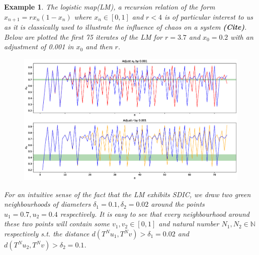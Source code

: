\documentclass[a4paper,12pt,twoside]{report}
\newtheorem{Example}{Example}[]
\begin{document}
\begin{Example}
  The logistic map(LM), a recursion relation of the form $x_{n+1}=rx_n(1-x_n)$ where $x_n\in[0,1]$ and $r<4$ is of particular interest to us as it is classically used to illustrate the influence of chaos on a system \textbf{(Cite)}. Below are plotted the first 75 iterates of the LM for $r=3.7$ and $x_0=0.2$ with an adjustment of 0.001 in $x_0$ and then $r$.

  \begin{figure}[ht]
    \includegraphics[scale=0.45]{_log_sdic.eps}
        \centering
        \label{fig:log_sdic}
      \end{figure}
  
  For an intuitive sense of the fact that the LM exhibits SDIC, we draw two green neighbourhoods of diameters $\delta_1=0.1, \delta_2=0.02$ around the points $u_1=0.7, u_2=0.4$ respectively. It is easy to see that every neighbourhood around these two points will contain some $v_1, v_2\in[0,1]$ and natural number $N_1, N_2 \in\mathbb{N}$ respectively s.t. the distance $d(T^Nu_1,T^Nv)>\delta_1=0.02$ and $d(T^Nu_2,T^Nv)>\delta_2=0.1$. 
  

\end{Example}
\end{document}
